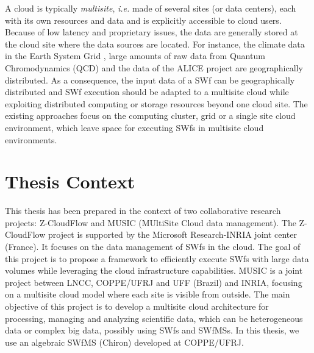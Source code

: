 A cloud is typically \textit{multisite}, \textit{i.e.} made of several sites (or data centers), each with its own resources and data and is explicitly accessible to cloud users.
Because of low latency and proprietary issues, the data are generally stored at the cloud site where the data sources are located. 
For instance, the climate data in the Earth System Grid \cite{Williams2009}, large amounts of raw data from Quantum Chromodynamics (QCD) \cite{Perry2005} and the data of the ALICE project \cite{alice} are geographically distributed.
As a consequence, the input data of a SWf can be geographically distributed and SWf execution should be adapted to a multisite cloud while exploiting distributed computing or storage resources beyond one cloud site. 
The existing approaches focus on the computing cluster, grid or a single site cloud environment, which leave space for executing SWfs in multisite cloud environments. 


\section{Thesis Context}
This thesis has been prepared in the context of two collaborative research projects: Z-CloudFlow and MUSIC (MUltiSite Cloud data management). The Z-CloudFlow project is supported by the Microsoft Research-INRIA joint center (France). It focuses on the data management of SWfs in the cloud. The goal of this project is to propose a framework to efficiently execute SWfs with large data volumes while leveraging the cloud infrastructure capabilities. MUSIC is a joint project between LNCC, COPPE/UFRJ and UFF (Brazil) and INRIA, focusing on a multisite cloud model where each site is visible from outside. The main objective of this project is to develop a multisite cloud architecture for processing, managing and analyzing scientific data, which can be heterogeneous data or complex big data, possibly using SWfs and SWfMSs. In this thesis, we use an algebraic SWfMS (Chiron) developed at COPPE/UFRJ.

